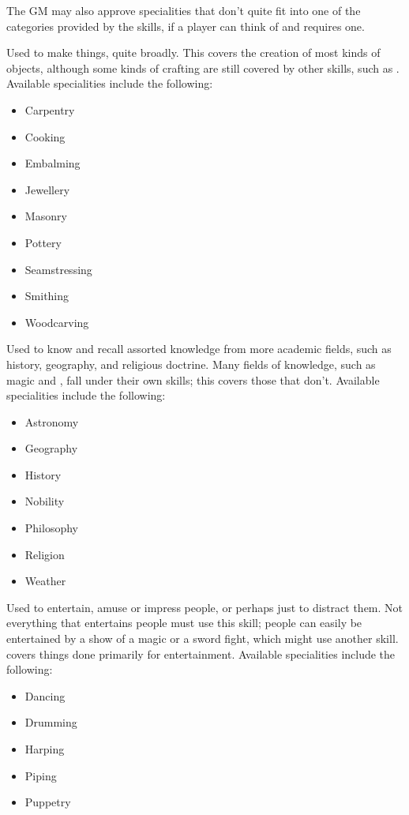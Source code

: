 The GM may also approve specialities that don't quite fit into one of the categories provided by the skills, if a player can think of and requires one.


Used to make things, quite broadly.
This covers the creation of most kinds of objects, although some kinds of crafting are still covered by other skills, such as .
Available specialities include the following:

\begin{itemize}
	\item Carpentry
	\item Cooking
	\item Embalming
	\item Jewellery
	\item Masonry
	\item Pottery
	\item Seamstressing
	\item Smithing
	\item Woodcarving
\end{itemize}


Used to know and recall assorted knowledge from more academic fields, such as history, geography, and religious doctrine. %
Many fields of knowledge, such as magic and , fall under their own skills; this covers those that don't.
Available specialities include the following:

\begin{itemize}
	\item Astronomy
	\item Geography
	\item History
	\item Nobility
	\item Philosophy
	\item Religion %
	\item Weather
\end{itemize}


Used to entertain, amuse or impress people, or perhaps just to distract them.
Not everything that entertains people must use this skill; people can easily be entertained by a show of a magic or a sword fight, which might use another skill.
 covers things done primarily for entertainment.
Available specialities include the following:

\begin{itemize}
	\item Dancing
	\item Drumming
	\item Harping
	\item Piping
	\item Puppetry
\end{itemize}
